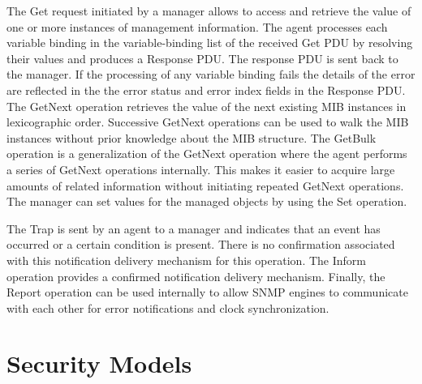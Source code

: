 The Get request initiated by a manager allows to access and retrieve the value of one or more instances of management information. The agent processes each variable binding in the variable-binding list of the received Get PDU by resolving their values and produces a Response PDU. The response PDU is sent back to the manager. If the processing of any variable binding fails the details of the error are reflected in the the error status and error index fields in the Response PDU. The GetNext operation retrieves the value of the next existing MIB instances in lexicographic order. Successive GetNext operations can be used to walk the MIB instances without prior knowledge about the MIB structure. The GetBulk operation is a generalization of the GetNext operation where the agent performs a series of GetNext operations internally. This makes it easier to acquire large amounts of related information without initiating repeated GetNext operations. The manager can set values for the managed objects by using the Set operation.

The Trap is sent by an agent to a manager and indicates that an event has occurred or a certain condition is present. There is no confirmation associated with this notification delivery mechanism for this operation. The Inform operation provides a confirmed notification delivery mechanism. Finally, the Report operation can be used internally to allow SNMP engines to communicate with each other for error notifications and clock synchronization.



\section{Security Models}


